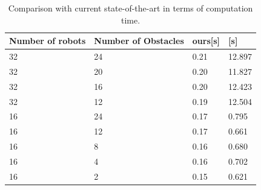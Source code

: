 

\begin{table}
\begin{center}
\caption{Comparison with current state-of-the-art \citep{park2020efficient} in terms of computation time.  }
\label{table_comptime_seq}
\begin{tabular}{ |p{3.5cm}|p{3cm}|p{2cm}|p{2cm}|}
\hline
 Number of robots & Number of Obstacles & ours[s] & \citep{park2020efficient}[s]  \\
 \hline
 32 & 24 & 0.21 &  12.897\\
 \hline
 32 & 20 &  0.20 &  11.827\\
 \hline
 32 & 16 & 0.20 & 12.423\\
 \hline
 32 & 12 & 0.19 & 12.504\\
 \hline
 16 & 24 & 0.17 & 0.795\\ 
 \hline
 16 & 12 & 0.17& 0.661\\
 \hline
 16 & 8 & 0.16& 0.680\\
 \hline
 16 & 4 & 0.16 & 0.702\\
 \hline
 16 & 2 & 0.15 & 0.621\\
 \hline
\end{tabular}
\end{center}
\end{table}


